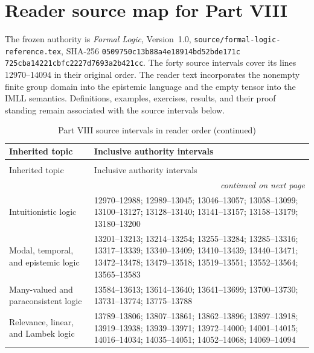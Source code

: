 \section*{Reader source map for Part VIII}
\label{sec:p08-source-map}

The frozen authority is \emph{Formal Logic}, Version~1.0,
\texttt{source/formal-logic-reference.tex}, SHA-256
\texttt{0509750c13b88a4e\allowbreak18914bd52bde171c\allowbreak
725cba14221cbfc2\allowbreak227d7693a2b421cc}.
The forty source intervals cover its lines 12970--14094 in their original
order.  The reader text incorporates the nonempty finite group domain into
the epistemic language and the empty tensor into the IMLL semantics.
Definitions, examples, exercises, results, and their proof standing remain
associated with the source intervals below.

\begin{longtable}{@{}p{}p{}@{}}
\caption{Part VIII source intervals in reader order.}
\label{tab:p08-source-intervals}\\
\toprule
Inherited topic & Inclusive authority intervals \\
\midrule
\endfirsthead
\caption[]{Part VIII source intervals in reader order (continued)}\\
\toprule
Inherited topic & Inclusive authority intervals \\
\midrule
\endhead
\midrule\multicolumn{2}{r}{\emph{continued on next page}}\\
\endfoot
\endlastfoot
Intuitionistic logic &
12970--12988; 12989--13045; 13046--13057; 13058--13099;
13100--13127; 13128--13140; 13141--13157; 13158--13179;
13180--13200 \\
Modal, temporal, and epistemic logic &
13201--13213; 13214--13254; 13255--13284; 13285--13316;
13317--13339; 13340--13409; 13410--13439; 13440--13471;
13472--13478; 13479--13518; 13519--13551; 13552--13564;
13565--13583 \\
Many-valued and paraconsistent logic &
13584--13613; 13614--13640; 13641--13699; 13700--13730;
13731--13774; 13775--13788 \\
Relevance, linear, and Lambek logic &
13789--13806; 13807--13861; 13862--13896; 13897--13918;
13919--13938; 13939--13971; 13972--14000; 14001--14015;
14016--14034; 14035--14051; 14052--14068; 14069--14094 \\
\bottomrule
\end{longtable}


